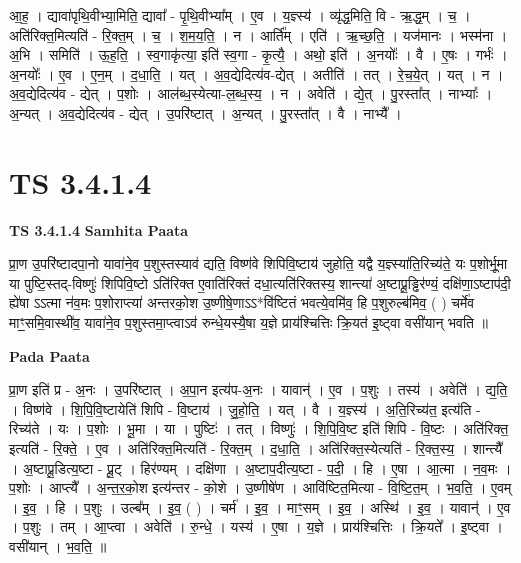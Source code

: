 \documentclass[17pt]{extarticle}
\begin{document}
आ॒ह॒ । द्यावा॑पृथि॒वीभ्या॒मिति॒ द्यावा᳚ - पृ॒थि॒वीभ्या᳚म् । ए॒व । य॒ज्ञ्स्य॑ । व्यृ॑द्ध॒मिति॒ वि - ऋ॒द्ध॒म् । च॒ । अति॑रिक्त॒मित्यति॑ - रि॒क्त॒म् । च॒ । श॒म॒य॒ति॒ । न । आर्ति᳚म् । एति॑ । ऋ॒च्छ॒ति॒ । यज॑मानः । भस्म॑ना । अ॒भि । समिति॑ । ऊ॒ह॒ति॒ । स्व॒गाकृ॑त्या॒ इति॑ स्व॒गा - कृ॒त्यै॒ । अथो॒ इति॑ । अ॒नयोः᳚ । वै । ए॒षः । गर्भः॑ । अ॒नयोः᳚ । ए॒व । ए॒न॒म् । द॒धा॒ति॒ । यत् । अ॒व॒द्येदित्य॑व-द्येत् । अतीति॑ । तत् । रे॒च॒ये॒त् । यत् । न । अ॒व॒द्येदित्य॑व - द्येत् । प॒शोः । आल॑ब्ध॒स्येत्या-ल॒ब्ध॒स्य॒ । न । अवेति॑ । द्ये॒त् । पु॒रस्ता᳚त् । नाभ्याः᳚ । अ॒न्यत् । अ॒व॒द्येदित्य॑व - द्येत् । उ॒परि॑ष्टात् । अ॒न्यत् । पु॒रस्ता᳚त् । वै । नाभ्यै᳚ ।  \newline




\section*{ TS 3.4.1.4 }

\textbf{TS 3.4.1.4 } \newline
\textbf{Samhita Paata} \newline

प्रा॒ण उ॒परि॑ष्टादपा॒नो यावा॑ने॒व प॒शुस्तस्याव॑ द्यति॒ विष्ण॑वे शिपिवि॒ष्टाय॑ जुहोति॒ यद्वै य॒ज्ञ्स्या॑ति॒रिच्य॑ते॒ यः प॒शोर्भू॒मा या पुष्टि॒स्तद्-विष्णुः॑ शिपिवि॒ष्टो ऽति॑रिक्त ए॒वाति॑रिक्तं दधा॒त्यति॑रिक्तस्य॒ शान्त्या॑ अ॒ष्टाप्रू॒ड्ढिर॑ण्यं॒ दक्षि॑णा॒ऽष्टाप॑दी॒ ह्ये॑षा ऽऽत्मा न॑व॒मः प॒शोराप्त्या॑ अन्तरको॒श उ॒ष्णीषे॒णाऽऽ*वि॑ष्टितं भवत्ये॒वमि॑व॒ हि प॒शुरुल्ब॑मिव॒ ( ) चर्मे॑व माꣳ॒॒समि॒वास्थी॑व॒ यावा॑ने॒व प॒शुस्तमा॒प्त्वाऽव॑ रुन्धे॒यस्यै॒षा य॒ज्ञे प्राय॑श्चित्तिः क्रि॒यत॑ इ॒ष्ट्वा वसी॑यान् भवति ॥ \newline

\textbf{Pada Paata} \newline

प्रा॒ण इति॑ प्र - अ॒नः । उ॒परि॑ष्टात् । अ॒पा॒न इत्य॑प-अ॒नः । यावान्॑ । ए॒व । प॒शुः । तस्य॑ । अवेति॑ । द्य॒ति॒ । विष्ण॑वे । शि॒पि॒वि॒ष्टायेति॑ शिपि - वि॒ष्टाय॑ । जु॒हो॒ति॒ । यत् । वै । य॒ज्ञ्स्य॑ । अ॒ति॒रिच्य॑त॒ इत्य॑ति - रिच्य॑ते । यः । प॒शोः । भू॒मा । या । पुष्टिः॑ । तत् । विष्णुः॑ । शि॒पि॒वि॒ष्ट इति॑ शिपि - वि॒ष्टः । अति॑रिक्त॒ इत्यति॑ - रि॒क्ते॒ । ए॒व । अति॑रिक्त॒मित्यति॑ - रि॒क्त॒म् । द॒धा॒ति॒ । अति॑रिक्त॒स्येत्यति॑ - रि॒क्त॒स्य॒ । शान्त्यै᳚ । अ॒ष्टाप्रू॒डित्य॒ष्टा - प्रू॒ट् । हिर॑ण्यम् । दक्षि॑णा । अ॒ष्टाप॒दीत्य॒ष्टा - प॒दी॒ । हि । ए॒षा । आ॒त्मा । न॒व॒मः । प॒शोः । आप्त्यै᳚ । अ॒न्त॒र॒को॒श इत्य॑न्तर - को॒शे । उ॒ष्णीषे॑ण । आवि॑ष्टित॒मित्या - वि॒ष्टि॒त॒म् । भ॒व॒ति॒ । ए॒वम् । इ॒व॒ । हि । प॒शुः । उल्ब᳚म् । इ॒व॒ ( ) । चर्म॑ । इ॒व॒ । माꣳ॒॒सम् । इ॒व॒ । अस्थि॑ । इ॒व॒ । यावान्॑ । ए॒व । प॒शुः । तम् । आ॒प्त्वा । अवेति॑ । रु॒न्धे॒ । यस्य॑ । ए॒षा । य॒ज्ञे । प्राय॑श्चित्तिः । क्रि॒यते᳚ । इ॒ष्ट्वा । वसी॑यान् । भ॒व॒ति॒ ॥  \newline
\end{document}
